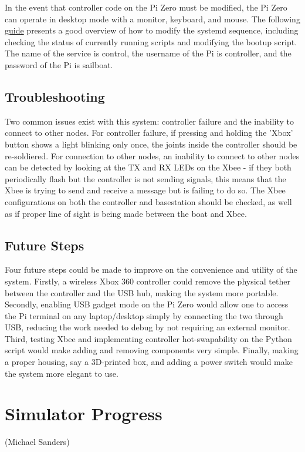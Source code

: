 \documentclass{article}
\begin{document}
In the event that controller code on the Pi Zero must be modified, the Pi Zero can operate in desktop mode with a monitor, keyboard, and mouse. The following \href{https://www.thedigitalpictureframe.com/ultimate-guide-systemd-autostart-scripts-raspberry-pi/}{guide} presents a good overview of how to modify the systemd sequence, including checking the status of currently running scripts and modifying the bootup script. The name of the service is control, the username of the Pi is controller, and the password of the Pi is sailboat. 

\subsection{Troubleshooting}
Two common issues exist with this system: controller failure and the inability to connect to other nodes. For controller failure, if pressing and holding the 'Xbox' button shows a light blinking only once, the joints inside the controller should be re-soldiered. For connection to other nodes, an inability to connect to other nodes can be detected by looking at the TX and RX LEDs on the Xbee - if they both periodically flash but the controller is not sending signals, this means that the Xbee is trying to send and receive a message but is failing to do so. The Xbee configurations on both the controller and basestation should be checked, as well as if proper line of sight is being made between the boat and Xbee. 

\subsection{Future Steps}
Four future steps could be made to improve on the convenience and utility of the system. Firstly, a wireless Xbox 360 controller could remove the physical tether between the controller and the USB hub, making the system more portable. Secondly, enabling USB gadget mode on the Pi Zero would allow one to access the Pi terminal on any laptop/desktop simply by connecting the two through USB, reducing the work needed to debug by not requiring an external monitor. Third, testing Xbee and implementing controller hot-swapability on the Python script would make adding and removing components very simple. Finally, making a proper housing, say a 3D-printed box, and adding a power switch would make the system more elegant to use.

\section{Simulator Progress}
(Michael Sanders)
\newline
\end{document}
